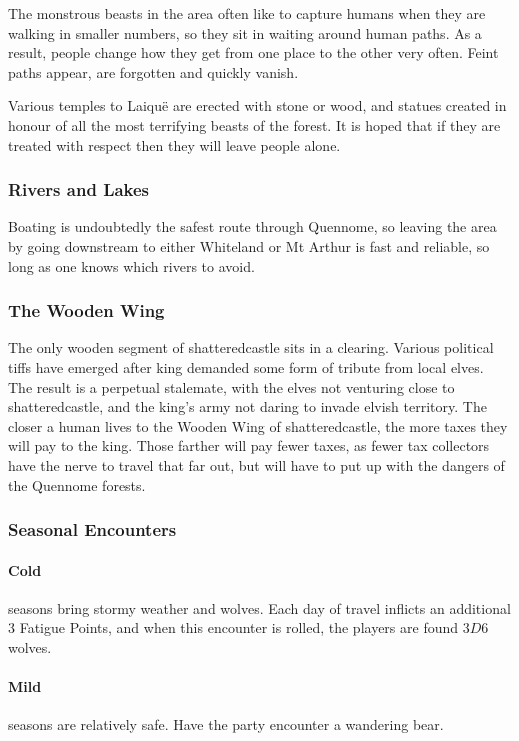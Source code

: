 \begin{multicols}{2}
The monstrous beasts in the area often like to capture humans when they are walking in smaller numbers, so they sit in waiting around human paths.
As a result, people change how they get from one place to the other very often.
Feint paths appear, are forgotten and quickly vanish.

Various temples to Laiqu\"{e} are erected with stone or wood, and statues created in honour of all the most terrifying beasts of the forest.  It is hoped that if they are treated with respect then they will leave people alone.

\subsubsection{Rivers and Lakes}

Boating is undoubtedly the safest route through Quennome, so leaving the area by going downstream to either Whiteland or Mt Arthur is fast and reliable, so long as one knows which rivers to avoid.

\subsubsection{The Wooden Wing}

The only wooden segment of \gls{shatteredcastle} sits in a clearing.
Various political tiffs have emerged after \gls{king} demanded some form of tribute from local elves.
The result is a perpetual stalemate, with the elves not venturing close to \gls{shatteredcastle}, and the king's army not daring to invade elvish territory.
The closer a human lives to the Wooden Wing of \gls{shatteredcastle}, the more taxes they will pay to the king.
Those farther will pay fewer taxes, as fewer tax collectors have the nerve to travel that far out, but will have to put up with the dangers of the Quennome forests.

\subsubsection{Seasonal Encounters}

\paragraph{Cold} seasons bring stormy weather and wolves.
Each day of travel inflicts an additional 3 Fatigue Points, and when this encounter is rolled, the players are found $3D6$ wolves.

\paragraph{Mild} seasons are relatively safe.
Have the party encounter a wandering bear.


\end{multicols}
